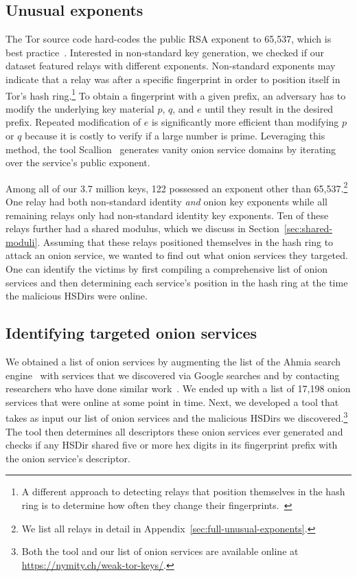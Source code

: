 \subsection{Unusual exponents}
\label{sec:unusual-exponents}
The Tor source code hard-codes the public RSA exponent to 65,537, which is best
practice~\cite[\S~4]{Boneh1999a}.  Interested in non-standard key generation, we
checked if our dataset featured relays with different exponents.  Non-standard
exponents may indicate that a relay was after a specific fingerprint in order to
position itself in Tor's hash ring.\footnote{A different approach to detecting
relays that position themselves in the hash ring is to determine how often they
change their fingerprints.~\cite[\S~4.3.3]{Winter2016a}} To obtain a fingerprint
with a given prefix, an adversary has to modify the underlying key material $p$,
$q$, and $e$ until they result in the desired prefix.  Repeated modification of
$e$ is significantly more efficient than modifying $p$ or $q$ because it is
costly to verify if a large number is prime.  Leveraging this method, the tool
Scallion~\cite{scallion} generates vanity onion service domains by iterating
over the service's public exponent.

Among all of our 3.7 million keys, 122 possessed an exponent other than
65,537.\footnote{We list all relays in detail in
Appendix~\ref{sec:full-unusual-exponents}.} One relay had both non-standard
identity \emph{and} onion key exponents while all remaining relays only had
non-standard identity key exponents.  Ten of these relays further had a shared
modulus, which we discuss in Section~\ref{sec:shared-moduli}.  Assuming that
these relays positioned themselves in the hash ring to attack an onion service,
we wanted to find out what onion services they targeted.  One can identify the
victims by first compiling a comprehensive list of onion services and then
determining each service's position in the hash ring at the time the malicious
HSDirs were online.

\subsection{Identifying targeted onion services}
\label{sec:targeted-onion-services}

We obtained a list of onion services by augmenting the list of the Ahmia
search engine~\cite{ahmia} with services that we discovered via Google searches
and by contacting researchers who have done similar work~\cite{Matic2015a}.  We
ended up with a list of 17,198 onion services that were online at some point in
time.  Next, we developed a tool that takes as input our list of onion services
and the malicious HSDirs we discovered.\footnote{Both the tool and our list of
onion services are available online at \url{https://nymity.ch/weak-tor-keys/}.}
The tool then determines all descriptors these onion services ever generated and
checks if any HSDir shared five or more hex digits in its fingerprint prefix
with the onion service's descriptor.

